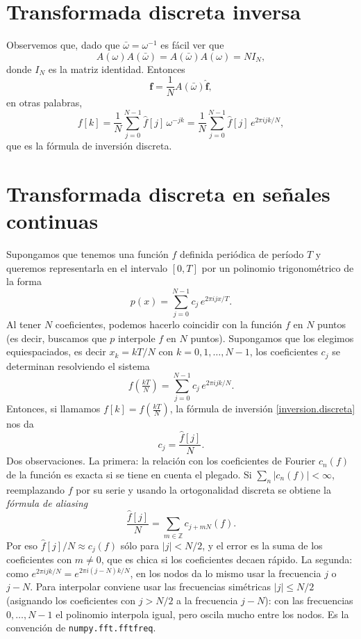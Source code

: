 \documentclass[12pt, a4paper]{amsbook}
\newcommand{\Z}{{\mathbb Z}}
\newcommand{\ff}{{\mathbf f}}
\theoremstyle{remark}
\theoremstyle{definition}
\numberwithin{section}{chapter}
\numberwithin{subsection}{section}
\numberwithin{equation}{section}
\numberwithin{figure}{chapter}
\begin{document}
\section{Transformada discreta inversa}

Observemos que, dado que $\bar \omega = \omega^{-1}$ es fácil ver que 
$$
A(\omega)A(\bar\omega) = A(\bar\omega)A(\omega) = N I_N,
$$
donde $I_N$ es la matriz identidad. Entonces
$$
\ff = \frac{1}{N} A(\bar\omega)\hat \ff,
$$
en otras palabras,
\begin{equation}\label{inversion.discreta}
f[k] = \frac{1}{N}\sum_{j=0}^{N-1} \hat f[j] \, \omega^{-jk} = \frac{1}{N}\sum_{j=0}^{N-1} \hat f[j] \, e^{2\pi i jk/N},
\end{equation}
que es la fórmula de inversión discreta.

\section{Transformada discreta en señales continuas}\label{sec:DFT-continuas}

Supongamos que tenemos una función $f$ definida periódica de período $T$ y queremos representarla en el intervalo $[0,T]$ por un polinomio trigonométrico de la forma
$$
p(x) = \sum_{j=0}^{N-1} c_j\, e^{2\pi i jx/T}.
$$
Al tener $N$ coeficientes, podemos hacerlo coincidir con la función $f$ en $N$ puntos (es decir, buscamos que $p$ interpole $f$ en $N$ puntos). Supongamos que los elegimos equiespaciados, es decir $x_k = kT/N$ con $k=0,1,\dots,N-1$, los coeficientes $c_j$ se determinan resolviendo el sistema
$$
f(\tfrac{kT}{N}) = \sum_{j=0}^{N-1} c_j\, e^{2\pi i jk/N}.
$$
Entonces, si llamamos $f[k]=f(\tfrac{kT}{N})$, la fórmula de inversión \eqref{inversion.discreta} nos da
$$
c_j = \frac{\hat f[j]}{N}.
$$
Dos observaciones. La primera: la relación con los coeficientes de Fourier $c_n(f)$ de la función es exacta si se tiene en cuenta el plegado. Si $\sum_n|c_n(f)|<\infty$, reemplazando $f$ por su serie y usando la ortogonalidad discreta se obtiene la \emph{fórmula de aliasing}
$$
\frac{\hat f[j]}{N} = \sum_{m\in\Z} c_{j+mN}(f).
$$
Por eso $\hat f[j]/N\approx c_j(f)$ sólo para $|j|<N/2$, y el error es la suma de los coeficientes con $m\neq0$, que es chica si los coeficientes decaen rápido. La segunda: como $e^{2\pi i jk/N}=e^{2\pi i (j-N)k/N}$, en los nodos da lo mismo usar la frecuencia $j$ o $j-N$. Para interpolar conviene usar las frecuencias simétricas $|j|\le N/2$ (asignando los coeficientes con $j>N/2$ a la frecuencia $j-N$): con las frecuencias $0,\dots,N-1$ el polinomio interpola igual, pero oscila mucho entre los nodos. Es la convención de \texttt{numpy.fft.fftfreq}.
\end{document}
